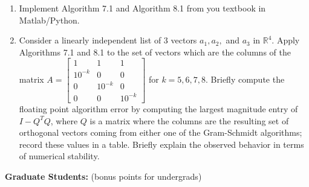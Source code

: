 \documentclass{ximera}
\begin{document}
\begin{exercise}
    \begin{enumerate}
        \item Implement Algorithm 7.1 and Algorithm 8.1 from you textbook in Matlab/Python. 
        \item Consider a linearly independent list of $3$ vectors $a_1, a_2,$ and $a_3$ in $\mathbb{R}^4$.  Apply Algorithms 7.1 and 8.1 to the set of vectors which are the columns of the matrix
            $A = \begin{bmatrix}    
            1 & 1 & 1\\
            10^{-k} & 0 &0 \\
            0 & 10^{-k} & 0\\
            0 & 0 & 10^{-k}
            \end{bmatrix}
            $
            for $k = 5,6,7,8$.  
            Briefly compute the floating point algorithm error by computing the largest magnitude entry of $I - Q^TQ$, where $Q$ is a matrix where the columns are the resulting set of orthogonal vectors coming from either one of the Gram-Schmidt algorithms; record these values in a table.  Briefly explain the observed behavior in terms of numerical stability.
    \end{enumerate}
\end{exercise}


\textbf{Graduate Students:} (bonus points for undergrads)
\end{document}
